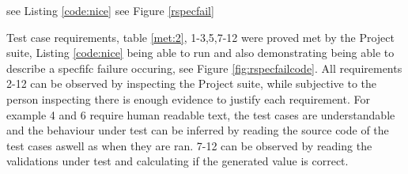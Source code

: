 \documentclass[a4paper,12pt]{article}
\begin{document}
see Listing \ref{code:nice} see Figure \ref{rspecfail}

\par Test case requirements, table \ref{met:2}, 1-3,5,7-12 were proved met by the Project suite, Listing \ref{code:nice} being able to run and also demonstrating being able to describe a specfifc failure occuring,  see Figure \ref{fig:rspecfailcode}. All requirements 2-12 can be observed by inspecting the Project suite, while subjective to the person inspecting there is enough evidence to justify each requirement. For example 4 and 6 require human readable text, the test cases are understandable and the behaviour under test can be inferred by reading the source code of the test cases aswell as when they are ran. 7-12 can be observed by reading the validations under test and calculating if the generated value is correct.
\end{document}
